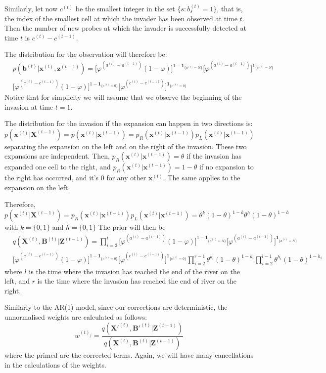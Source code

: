\documentclass[11pt,a4paper]{article}
\newcommand{\one}[1]{\mathbf{1}_{\{#1\}}}
\renewcommand{\vec}[1]{\mathbf{#1}}
\begin{document}
Similarly, let now $c^{(t)}$ be the smallest integer in the set $\{ s : b_s^{(t)} = 1 \}$, that is, the index of the smallest cell at which the invader has been observed at time $t$. Then the number of new probes at which the invader is successfully detected at time $t$ is $c^{(t)} - c^{(t-1)}$.

The distribution for the observation will therefore be:
\begin{align*}
    & p(\vec{b}^{(t)} | \vec{x}^{(t)}, \vec{z}^{(t-1)}) = \bigg [\varphi^{(a^{(t)} - a^{(t-1)})}(1 - \varphi)\bigg]^{1-\one {a^{(t)}=N}} \bigg [\varphi^{(a^{(t)} - a^{(t-1)})}\bigg]^{\one {a^{(t)}=N}} \\
    &\bigg[\varphi^{(c^{(t)} - c^{(t-1)})} (1 - \varphi)\bigg]^{1-\one {c^{(t)}=0}} \bigg[\varphi^{(c^{(t)} - c^{(t-1)})}\bigg]^{\one {c^{(t)}=0}}
\end{align*}
Notice that for simplicity we will assume that we observe the beginning of the invasion at time $t=1$. 

The distribution for the invasion if the expansion can happen in two directions is:
\[
    p(\vec{x}^{(t)} | \vec{X}^{(t-1)}) = p(\vec{x}^{(t)} | \vec{x}^{(t-1)}) = p_R(\vec{x}^{(t)} | \vec{x}^{(t-1)}) p_L(\vec{x}^{(t)} | \vec{x}^{(t-1)}) 
\]
separating the expansion on the left and on the right of the invasion.
These two expansions are independent. Then, $p_R(\vec{x}^{(t)} | \vec{x}^{(t-1)}) = \theta$ if the invasion has expanded one cell to the right, and $p_R(\vec{x}^{(t)} | \vec{x}^{(t-1)}) = 1 - \theta$ if no expansion to the right has occurred, and it's 0 for any other $\vec{x}^{(t)}$. The same applies to the expansion on the left.

Therefore,
\[
    p(\vec{x}^{(t)} | \vec{X}^{(t-1)}) = p_R(\vec{x}^{(t)} | \vec{x}^{(t-1)}) p_L(\vec{x}^{(t)} | \vec{x}^{(t-1)}) = \theta^{k} (1-\theta)^{1-k}\theta^{h} (1-\theta)^{1-h}
\]
with $k=\{0,1\}$ and $h=\{0,1\}$
The prior will then be
\begin{align*}
        & q(\vec{X}^{(t)},\vec{B}^{(t)} | \vec{Z}^{(t-1)}) = \prod_{i=2}^{t} \bigg [\varphi^{(a^{(i)} - a^{(i-1)})}(1 - \varphi)\bigg]^{1-\one {a^{(i)}=N}} \bigg [\varphi^{(a^{(i)} - a^{(i-1)})}\bigg]^{\one {a^{(i)}=N}} \\
        &\bigg[\varphi^{(c^{(i)} - c^{(i-1)})} (1 - \varphi)\bigg]^{1-\one {c^{(i)}=0}} \bigg[\varphi^{(c^{(i)} - c^{(i-1)})}\bigg]^{\one {c^{(i)}=0}}\prod_{i=2}^{r-1} \theta^{k_i} (1-\theta)^{1-k_i} \prod_{i=2}^{l-1} \theta^{h_i} (1-\theta)^{1-h_i}
\end{align*}
where $l$ is the time where the invasion has reached the end of the river on the left, and $r$ is the time where the invasion has reached the end of river on the right.


Similarly to the AR(1) model, since our corrections are deterministic, the unnormalised weights are calculated as follows:
\[
    w^{(t)_j} = \frac{q(\vec{X'}^{(t)},\vec{B'}^{(t)} | \vec{Z}^{(t-1)})}{q(\vec{X}^{(t)},\vec{B}^{(t)} | \vec{Z}^{(t-1)})}
\]
where the primed are the corrected terms. Again, we will have many cancellations in the calculations of the weights.
\end{document}
